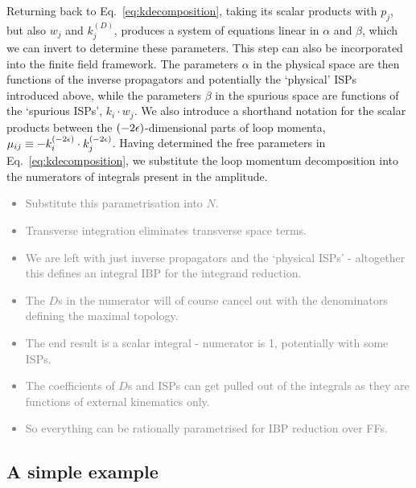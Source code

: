 \documentclass[main.tex]{subfiles}
\begin{document}
Returning back to Eq.~\ref{eq:kdecomposition}, taking its scalar products with $p_j$, but also $w_j$ and $k_j^{(D)}$, produces a system of equations linear in $\alpha$ and $\beta$, which we can invert to determine these parameters. This step can also be incorporated into the finite field framework. The parameters $\alpha$ in the physical space are then functions of the inverse propagators and potentially the `physical' ISPs introduced above, while the parameters $\beta$ in the spurious space are functions of the `spurious ISPs', $k_i \cdot w_j$. We also introduce a shorthand notation for the scalar products between the $(-2\epsilon)$-dimensional parts of loop momenta, $\mu_{ij} \equiv -k_i^{(-2\epsilon)} \cdot k_j^{(-2\epsilon)}$. Having determined the free parameters in Eq.~\ref{eq:kdecomposition}, we substitute the loop momentum decomposition into the numerators of integrals present in the amplitude. 
\textcolor{gray}{
\begin{itemize}
    \item Substitute this parametrisation into $N$.
    \item Transverse integration eliminates transverse space terms.
    \item We are left with just inverse propagators and the `physical ISPs' - altogether this defines an integral IBP for the integrand reduction.
    \item The $D$s in the numerator will of course cancel out with the denominators defining the maximal topology.
    \item The end result is a scalar integral - numerator is 1, potentially with some ISPs.
    \item The coefficients of $D$s and ISPs can get pulled out of the integrals as they are functions of external kinematics only.
    \item So everything can be rationally parametrised for IBP reduction over FFs.
\end{itemize}
}
\subsection{A simple example}
\end{document}
